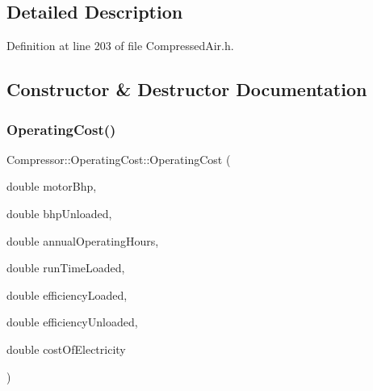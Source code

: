 \subsection{Detailed Description}


Definition at line 203 of file Compressed\+Air.\+h.



\subsection{Constructor \& Destructor Documentation}
\mbox{\label{class_compressor_1_1_operating_cost_aa5b9c984494fdfc08e31c2b7333f3657}} 
\subsubsection{\texorpdfstring{Operating\+Cost()}{OperatingCost()}\hspace{0.1cm}{\footnotesize\ttfamily [1/3]}}
{\footnotesize\ttfamily Compressor\+::\+Operating\+Cost\+::\+Operating\+Cost (\begin{DoxyParamCaption}\item[{double}]{motor\+Bhp,  }\item[{double}]{bhp\+Unloaded,  }\item[{double}]{annual\+Operating\+Hours,  }\item[{double}]{run\+Time\+Loaded,  }\item[{double}]{efficiency\+Loaded,  }\item[{double}]{efficiency\+Unloaded,  }\item[{double}]{cost\+Of\+Electricity }\end{DoxyParamCaption})}

